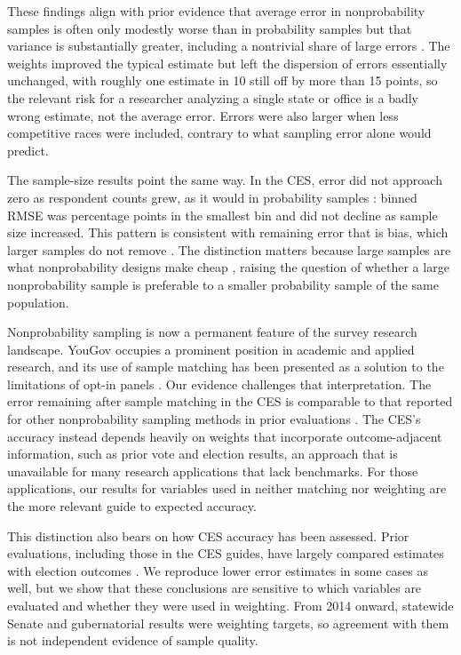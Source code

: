 \documentclass[12pt]{article}
\begin{document}
These findings align with prior evidence that average error in nonprobability samples is often only modestly worse than in probability samples but that variance is substantially greater, including a nontrivial share of large errors \parencite{chang_national_2009, yeager_comparing_2011, macinnis_accuracy_2018, cornesse_review_2020}. The weights improved the typical estimate but left the dispersion of errors essentially unchanged, with roughly one estimate in 10 still off by more than 15 points, so the relevant risk for a researcher analyzing a single state or office is a badly wrong estimate, not the average error. Errors were also larger when less competitive races were included, contrary to what sampling error alone would predict.

The sample-size results point the same way. In the CES, error did not approach zero as respondent counts grew, as it would in probability samples \parencite{cochran_sampling_1977}: binned RMSE was \AnchorRmse{} percentage points in the smallest bin and did not decline as sample size increased. This pattern is consistent with remaining error that is bias, which larger samples do not remove \parencite{bethlehem_selection_2010, meng_statistical_2018}. The distinction matters because large samples are what nonprobability designs make cheap \parencite{baker_report_2013}, raising the question of whether a large nonprobability sample is preferable to a smaller probability sample of the same population.

Nonprobability sampling is now a permanent feature of the survey research landscape. YouGov occupies a prominent position in academic and applied research, and its use of sample matching has been presented as a solution to the limitations of opt-in panels \parencite{crampton_about_2007, rivers_sampling_2007}. Our evidence challenges that interpretation. The error remaining after sample matching in the CES is comparable to that reported for other nonprobability sampling methods in prior evaluations \parencite{yeager_comparing_2011, macinnis_accuracy_2018}. The CES's accuracy instead depends heavily on weights that incorporate outcome-adjacent information, such as prior vote and election results, an approach that is unavailable for many research applications that lack benchmarks. For those applications, our results for variables used in neither matching nor weighting are the more relevant guide to expected accuracy.

This distinction also bears on how CES accuracy has been assessed. Prior evaluations, including those in the CES guides, have largely compared estimates with election outcomes \parencite{vavreck_2006_2008, rivers_inference_2009, ansolabehere_cooperative_2013, ansolabehere_does_2014}. We reproduce lower error estimates in some cases as well, but we show that these conclusions are sensitive to which variables are evaluated and whether they were used in weighting. From 2014 onward, statewide Senate and gubernatorial results were weighting targets, so agreement with them is not independent evidence of sample quality.
\end{document}
